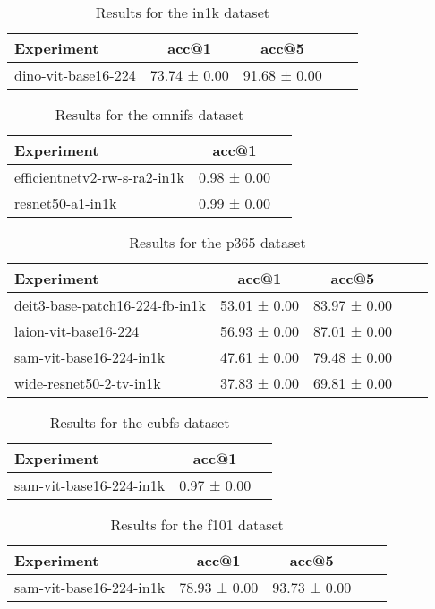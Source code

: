 \begin{table}[htbp]
\caption{Results for the in1k dataset}
\begin{tabular}{|l|c|c|c|c|}\hline
Experiment & acc@1 & acc@5\\
\hline
dino-vit-base16-224 & 73.74 ± 0.00 & 91.68 ± 0.00\\
\hline
\end{tabular}
\end{table}

\begin{table}[htbp]
\caption{Results for the omnifs dataset}
\begin{tabular}{|l|c|c|}\hline
Experiment & acc@1\\
\hline
efficientnetv2-rw-s-ra2-in1k & 0.98 ± 0.00\\
\hline
resnet50-a1-in1k & 0.99 ± 0.00\\
\hline
\end{tabular}
\end{table}

\begin{table}[htbp]
\caption{Results for the p365 dataset}
\begin{tabular}{|l|c|c|c|c|}\hline
Experiment & acc@1 & acc@5\\
\hline
deit3-base-patch16-224-fb-in1k & 53.01 ± 0.00 & 83.97 ± 0.00\\
\hline
laion-vit-base16-224 & 56.93 ± 0.00 & 87.01 ± 0.00\\
\hline
sam-vit-base16-224-in1k & 47.61 ± 0.00 & 79.48 ± 0.00\\
\hline
wide-resnet50-2-tv-in1k & 37.83 ± 0.00 & 69.81 ± 0.00\\
\hline
\end{tabular}
\end{table}

\begin{table}[htbp]
\caption{Results for the cubfs dataset}
\begin{tabular}{|l|c|c|}\hline
Experiment & acc@1\\
\hline
sam-vit-base16-224-in1k & 0.97 ± 0.00\\
\hline
\end{tabular}
\end{table}

\begin{table}[htbp]
\caption{Results for the f101 dataset}
\begin{tabular}{|l|c|c|c|c|}\hline
Experiment & acc@1 & acc@5\\
\hline
sam-vit-base16-224-in1k & 78.93 ± 0.00 & 93.73 ± 0.00\\
\hline
\end{tabular}
\end{table}

